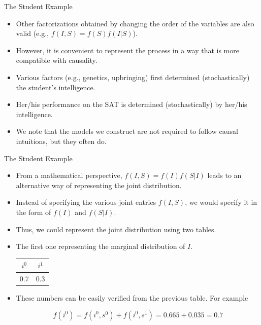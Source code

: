 \documentclass[handout]{beamer}
\begin{document}
\begin{frame}{The Student Example}
\scriptsize{
\begin{itemize}

\item Other factorizations obtained by changing the order of the variables are also valid (e.g., $f(I,S) = f(S)f(I|S)$).


\item However, it is convenient to represent the process in a way that is more compatible with causality.

\item Various factors (e.g., genetics, upbringing) first determined (stochastically) the student's intelligence.
\item Her/his performance on the SAT is determined (stochastically) by her/his  intelligence. 
\item We note that the models we construct are not required to follow causal intuitions, but they often do.



\end{itemize}



} 

\end{frame}


\begin{frame}{The Student Example}
\scriptsize{
\begin{itemize}

\item From a mathematical perspective, $ f(I,S) = f(I)f(S|I)$ leads to an alternative way of representing the joint distribution. 

\item Instead of specifying the various joint entries $f(I,S)$, we would specify it in the form of $f(I)$ and $f(S|I)$. 
\item Thus, we could represent the joint distribution using two tables.

\item The first one representing the marginal distribution of $I$.


\begin{table}
\centering
  \begin{tabular}{cc} \hline
$i^0$ & $i^1$  \\ \hline
0.7 & 0.3   
\end{tabular} 
\end{table}

\item These numbers can be easily verified from the previous table. For example 

\begin{displaymath}
f(i^{0})=f(i^{0},s^0)+f(i^{0},s^1)=0.665+0.035=0.7 
\end{displaymath}




\end{itemize}



} 

\end{frame}
\end{document}
